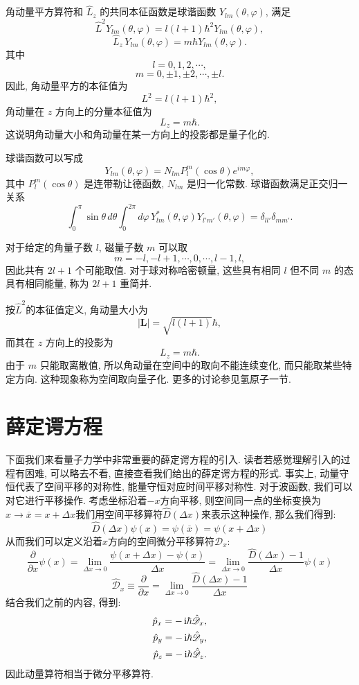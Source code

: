角动量平方算符和 $\hat L_z$ 的共同本征函数是球谐函数 $Y_{lm}(\theta, \varphi)$, 满足
\[
\hat L^2Y_{lm}(\theta, \varphi)
=
l(l+1)\hbar^2Y_{lm}(\theta, \varphi),
\]
\[
\hat L_z\,Y_{lm}(\theta, \varphi)
=
m\hbar Y_{lm}(\theta, \varphi).
\]
其中
\[
l=0, 1, 2, \cdots,
\]
\[
m=0, \pm1, \pm2, \cdots, \pm l.
\]
因此, 角动量平方的本征值为
\[
L^2=l(l+1)\hbar^2,
\]
角动量在 $z$ 方向上的分量本征值为
\[
L_z=m\hbar.
\]
这说明角动量大小和角动量在某一方向上的投影都是量子化的.

球谐函数可以写成
\[
Y_{lm}(\theta, \varphi)
=
N_{lm}P_l^m(\cos\theta)e^{im\varphi},
\]
其中 $P_l^m(\cos\theta)$ 是连带勒让德函数, $N_{lm}$ 是归一化常数. 球谐函数满足正交归一关系
\[
\int_0^\pi \sin\theta\, d\theta
\int_0^{2\pi} d\varphi\,
Y_{lm}^*(\theta, \varphi)
Y_{l'm'}(\theta, \varphi)
=
\delta_{ll'}\delta_{mm'}.
\]

对于给定的角量子数 $l$, 磁量子数 $m$ 可以取
\[
m=-l, -l+1, \cdots, 0, \cdots, l-1, l,
\]
因此共有 $2l+1$ 个可能取值. 对于球对称哈密顿量, 这些具有相同 $l$ 但不同 $m$ 的态具有相同能量, 称为 $2l+1$ 重简并.

按$\hat L^2$的本征值定义, 角动量大小为
\[
|\bm L|=\sqrt{l(l+1)}\hbar,
\]
而其在 $z$ 方向上的投影为
\[
L_z=m\hbar.
\]
由于 $m$ 只能取离散值, 所以角动量在空间中的取向不能连续变化, 而只能取某些特定方向. 这种现象称为空间取向量子化. 更多的讨论参见氢原子一节.


\section{薛定谔方程}
下面我们来看量子力学中非常重要的薛定谔方程的引入. 读者若感觉理解引入的过程有困难, 可以略去不看, 直接查看我们给出的薛定谔方程的形式. 事实上, 动量守恒代表了空间平移的对称性, 能量守恒对应时间平移对称性. 对于波函数, 我们可以对它进行平移操作. 考虑坐标沿着$-x$方向平移, 则空间同一点的坐标变换为$x\to \overline{x} = x+\Delta x$我们用空间平移算符$\hat{D}(\Delta x)$来表示这种操作, 那么我们得到:
\[
\hat{D}(\Delta x)\psi(x) = \psi(\overline{x}) = \psi(x+\Delta x)
\]
从而我们可以定义沿着$x$方向的空间微分平移算符$\mathscr{D}_x$:
\[
\frac{\partial}{\partial x}\psi(x) = \lim_{\Delta x\to 0}\frac{\psi(x+\Delta x)-\psi(x)}{\Delta x} = \lim_{\Delta x\to 0}\frac{\hat{D}(\Delta x)-1}{\Delta x}\psi(x)
\]
\[
\hat{\mathscr{D}}_x \equiv \frac{\partial}{\partial x}= \lim_{\Delta x\to 0}\frac{\hat{D}(\Delta x)-1}{\Delta x}
\]
结合我们之前的内容, 得到:
\begin{align*}
\hat{p}_x = -\mathop{}\!\mathrm{i}\hbar \hat{\mathscr{D}}_x, \\
\hat{p}_y = -\mathop{}\!\mathrm{i}\hbar \hat{\mathscr{D}}_y, \\
\hat{p}_z = -\mathop{}\!\mathrm{i}\hbar \hat{\mathscr{D}}_z.
\end{align*}
因此动量算符相当于微分平移算符.

